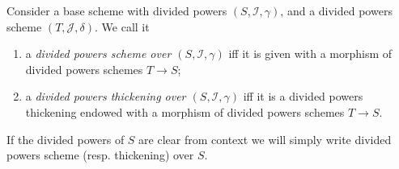 \begin{defn}
	Consider a base scheme with divided powers
	$\left(S, \mathcal{I}, \gamma\right)$, and a divided powers
	scheme $\left(T, \mathcal{J}, \delta\right)$.
	We call it 
\begin{enumerate}
	\item a {\em divided powers scheme over $\left(S, \mathcal{I}, \gamma\right)$}
		iff it is given with a morphism of divided powers 
		schemes $T \to S$;

	\item a {\em divided powers thickening over $\left(S, \mathcal{I}, \gamma\right)$}
		iff it is a divided powers thickening endowed
		with a morphism of divided powers schemes $T \to S$.
\end{enumerate}
	If the divided powers of $S$ are clear from context we will
	simply write divided powers scheme (resp$.$ thickening) over $S$.
\end{defn}


